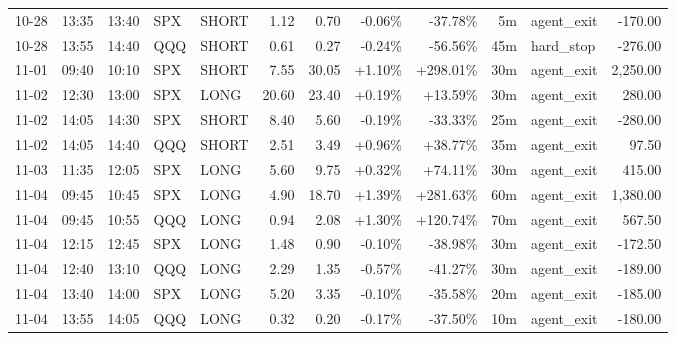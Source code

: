 \documentclass[11pt,a4paper,twoside]{article}
\begin{document}
\begin{center}
\begin{longtable}{>{\color{txtmain}}l l l l l r r r r r >{\color{txtmain}}l r}
10-28 & 13:35 & 13:40 & SPX & SHORT & 1.12 & 0.70 & \textcolor{lossred}{-0.06\%} & \textcolor{lossred}{-37.78\%} & 5m & agent\_exit & \textcolor{lossred}{-170.00} \\
10-28 & 13:55 & 14:40 & QQQ & SHORT & 0.61 & 0.27 & \textcolor{lossred}{-0.24\%} & \textcolor{lossred}{-56.56\%} & 45m & hard\_stop & \textcolor{lossred}{-276.00} \\
11-01 & 09:40 & 10:10 & SPX & SHORT & 7.55 & 30.05 & \textcolor{wingreen}{+1.10\%} & \textcolor{wingreen}{+298.01\%} & 30m & agent\_exit & \textcolor{wingreen}{2,250.00} \\
11-02 & 12:30 & 13:00 & SPX & LONG & 20.60 & 23.40 & \textcolor{wingreen}{+0.19\%} & \textcolor{wingreen}{+13.59\%} & 30m & agent\_exit & \textcolor{wingreen}{280.00} \\
11-02 & 14:05 & 14:30 & SPX & SHORT & 8.40 & 5.60 & \textcolor{lossred}{-0.19\%} & \textcolor{lossred}{-33.33\%} & 25m & agent\_exit & \textcolor{lossred}{-280.00} \\
11-02 & 14:05 & 14:40 & QQQ & SHORT & 2.51 & 3.49 & \textcolor{wingreen}{+0.96\%} & \textcolor{wingreen}{+38.77\%} & 35m & agent\_exit & \textcolor{wingreen}{97.50} \\
11-03 & 11:35 & 12:05 & SPX & LONG & 5.60 & 9.75 & \textcolor{wingreen}{+0.32\%} & \textcolor{wingreen}{+74.11\%} & 30m & agent\_exit & \textcolor{wingreen}{415.00} \\
11-04 & 09:45 & 10:45 & SPX & LONG & 4.90 & 18.70 & \textcolor{wingreen}{+1.39\%} & \textcolor{wingreen}{+281.63\%} & 60m & agent\_exit & \textcolor{wingreen}{1,380.00} \\
11-04 & 09:45 & 10:55 & QQQ & LONG & 0.94 & 2.08 & \textcolor{wingreen}{+1.30\%} & \textcolor{wingreen}{+120.74\%} & 70m & agent\_exit & \textcolor{wingreen}{567.50} \\
11-04 & 12:15 & 12:45 & SPX & LONG & 1.48 & 0.90 & \textcolor{lossred}{-0.10\%} & \textcolor{lossred}{-38.98\%} & 30m & agent\_exit & \textcolor{lossred}{-172.50} \\
11-04 & 12:40 & 13:10 & QQQ & LONG & 2.29 & 1.35 & \textcolor{lossred}{-0.57\%} & \textcolor{lossred}{-41.27\%} & 30m & agent\_exit & \textcolor{lossred}{-189.00} \\
11-04 & 13:40 & 14:00 & SPX & LONG & 5.20 & 3.35 & \textcolor{lossred}{-0.10\%} & \textcolor{lossred}{-35.58\%} & 20m & agent\_exit & \textcolor{lossred}{-185.00} \\
11-04 & 13:55 & 14:05 & QQQ & LONG & 0.32 & 0.20 & \textcolor{lossred}{-0.17\%} & \textcolor{lossred}{-37.50\%} & 10m & agent\_exit & \textcolor{lossred}{-180.00} \\

\end{longtable}
\end{center}
\end{document}
